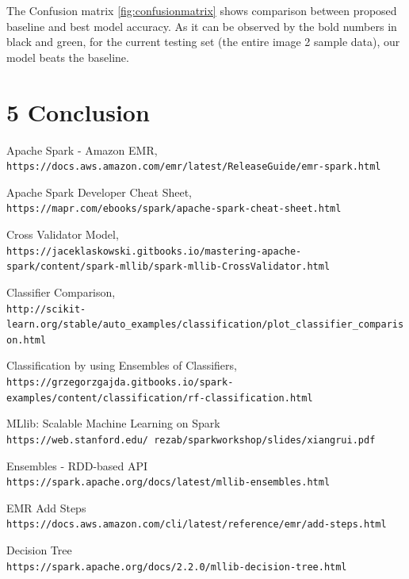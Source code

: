 \documentclass{neu_handout}
\begin{document}
The Confusion matrix \ref{fig:confusionmatrix} shows comparison between proposed baseline and best model accuracy. As it can be observed by the bold numbers in black and green, for the current testing set (the entire image 2 sample data), our model beats the baseline.


\section*{5 Conclusion}


\newpage

\begin{thebibliography}{9}

Apache Spark - Amazon EMR,
\\\texttt{https://docs.aws.amazon.com/emr/latest/ReleaseGuide/emr-spark.html}

Apache Spark Developer Cheat Sheet,
\\\texttt{https://mapr.com/ebooks/spark/apache-spark-cheat-sheet.html}

Cross Validator Model,
\\\texttt{https://jaceklaskowski.gitbooks.io/mastering-apache-spark/content/spark-mllib/spark-mllib-CrossValidator.html}

Classifier Comparison,
\\\texttt{http://scikit-learn.org/stable/auto\_examples/classification/plot\_classifier\_comparison.html}

Classification by using Ensembles of Classifiers,
\\\texttt{https://grzegorzgajda.gitbooks.io/spark-examples/content/classification/rf-classification.html}


MLlib: Scalable Machine Learning on Spark
\\\texttt{https://web.stanford.edu/~rezab/sparkworkshop/slides/xiangrui.pdf}


Ensembles - RDD-based API
\\\texttt{https://spark.apache.org/docs/latest/mllib-ensembles.html}

EMR Add Steps
\\\texttt{https://docs.aws.amazon.com/cli/latest/reference/emr/add-steps.html}

Decision Tree
\\\texttt{https://spark.apache.org/docs/2.2.0/mllib-decision-tree.html}

\end{thebibliography}
\end{document}
